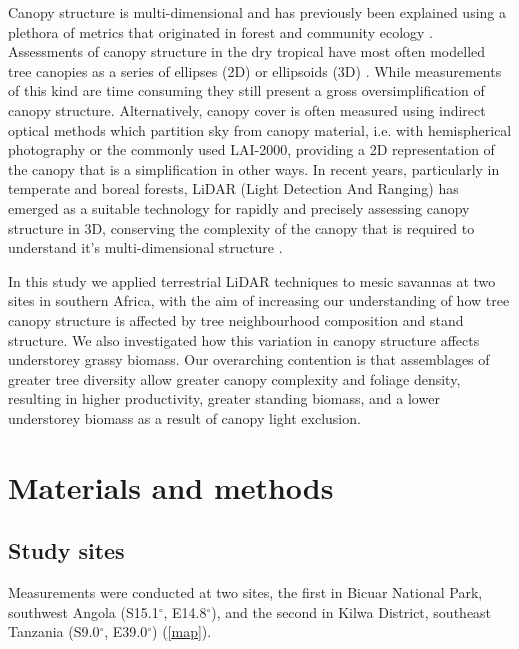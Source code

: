 \documentclass[11pt,a4paper]{article}
\begin{document}
Canopy structure is multi-dimensional and has previously been explained using a plethora of metrics that originated in forest and community ecology \citep{}. Assessments of canopy structure in the dry tropical have most often modelled tree canopies as a series of ellipses (2D) or ellipsoids (3D) \citep{}. While measurements of this kind are time consuming they still present a gross oversimplification of canopy structure. Alternatively, canopy cover is often measured using indirect optical methods which partition sky from canopy material, i.e. with hemispherical photography or the commonly used LAI-2000, providing a 2D representation of the canopy that is a simplification in other ways. In recent years, particularly in temperate and boreal forests, LiDAR (Light Detection And Ranging) has emerged as a suitable technology for rapidly and precisely assessing canopy structure in 3D, conserving the complexity of the canopy that is required to understand it's multi-dimensional structure \citep{}.

In this study we applied terrestrial LiDAR techniques to mesic savannas at two sites in southern Africa, with the aim of increasing our understanding of how tree canopy structure is affected by tree neighbourhood composition and stand structure. We also investigated how this variation in canopy structure affects understorey grassy biomass. Our overarching contention is that assemblages of greater tree diversity allow greater canopy complexity and foliage density, resulting in higher productivity, greater standing biomass, and a lower understorey biomass as a result of canopy light exclusion. 

\section{Materials and methods}

\subsection{Study sites}

Measurements were conducted at two sites, the first in Bicuar National Park, southwest Angola (S15.1$^\circ$, E14.8$^\circ$), and the second in Kilwa District, southeast Tanzania (S9.0$^\circ$, E39.0$^\circ$) (\autoref{map}).
\end{document}
